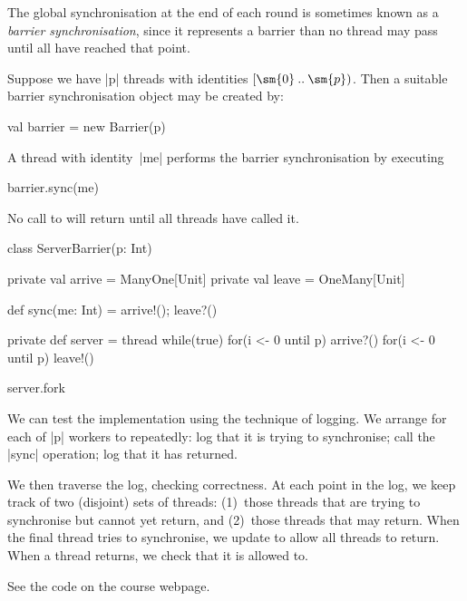 
\begin{slide}

The global synchronisation at the end of each round is sometimes known as a
\emph{barrier synchronisation}, since it represents a barrier than no thread
may pass until all have reached that point.

Suppose we have |p| threads with identities $[\sm{0} \mathbin{..} \sm{p})$.
  Then a suitable barrier synchronisation object may be created by:
%
\begin{scala}
val barrier = new Barrier(p)
\end{scala}
%

A thread with identity~|me| performs the barrier synchronisation by executing
%
\begin{scala}
barrier.sync(me)
\end{scala}
%
No call to  will return until all  threads have called
it. 
\end{slide}


\begin{slide}

\begin{scala}
class ServerBarrier(p: Int){
  private val arrive = ManyOne[Unit]
  private val leave = OneMany[Unit]

  def sync(me: Int) = { arrive!(); leave?() }

  private def server = thread{
    while(true){
      for(i <- 0 until p) arrive?()
      for(i <- 0 until p) leave!()
    }
  }

  server.fork
}
\end{scala}
\end{slide}




\begin{slide}

We can test the implementation using the technique of logging.  We arrange for
each of |p| workers to repeatedly: log that it is trying to synchronise; call
the |sync| operation; log that it has returned.

We then traverse the log, checking correctness.  At each point in the log, we
keep track of two (disjoint) sets of threads: (1)~those threads that are
trying to synchronise but cannot yet return, and (2)~those threads that may
return.  When the final thread tries to synchronise, we update to allow all
threads to return.  When a thread returns, we check that it is allowed to.

See the code on the course webpage.
\end{slide}

